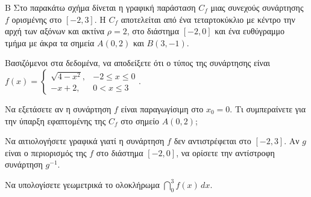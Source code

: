 \begin{thema}{Β}
Στο παρακάτω σχήμα δίνεται η γραφική παράσταση $C_f$ μιας συνεχούς συνάρτησης $f$ ορισμένης στο $[-2, 3]$. Η $C_f$ αποτελείται από ένα τεταρτοκύκλιο με κέντρο την αρχή των αξόνων και ακτίνα $\rho=2$, στο διάστημα $[-2, 0]$ και ένα ευθύγραμμο τμήμα με άκρα τα σημεία $A(0, 2)$ και $B(3, -1)$.

\begin{center}
\end{center}

\begin{erwthma}
  \item Βασιζόμενοι στα δεδομένα, να αποδείξετε ότι ο τύπος της συνάρτησης είναι $f(x) = \begin{cases} \sqrt{4-x^2}, & -2 \le x \le 0 \\ -x+2, & 0 < x \le 3 \end{cases}$.
  \item Να εξετάσετε αν η συνάρτηση $f$ είναι παραγωγίσιμη στο $x_0 = 0$. Τι συμπεραίνετε για την ύπαρξη εφαπτομένης της $C_f$ στο σημείο $A(0, 2)$;
  \item Να αιτιολογήσετε γραφικά γιατί η συνάρτηση $f$ δεν αντιστρέφεται στο $[-2, 3]$. Αν $g$ είναι ο περιορισμός της $f$ στο διάστημα $[-2, 0]$, να ορίσετε την αντίστροφη συνάρτηση $g^{-1}$.
  \item Να υπολογίσετε γεωμετρικά το ολοκλήρωμα $\dint_{0}^{3} f(x) \, dx$.
\end{erwthma}
\end{thema}


